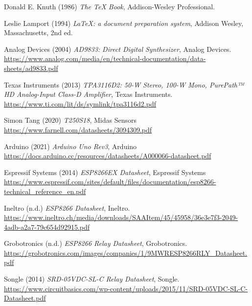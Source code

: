 \begin{thebibliography}{9}
Donald E. Knuth (1986) \emph{The \TeX{} Book}, Addison-Wesley Professional.

Leslie Lamport (1994) \emph{\LaTeX: a document preparation system}, Addison
Wesley, Massachusetts, 2nd ed.
    
Analog Devices (2004) \emph{AD9833: Direct Digital Synthesizer}, Analog Devices.
\url{https://www.analog.com/media/en/technical-documentation/data-sheets/ad9833.pdf}

Texas Instruments (2013) \emph{TPA3116D2: 50-W Stereo, 100-W Mono, PurePath™ HD Analog-Input Class-D Amplifier}, Texas Instruments.
\url{https://www.ti.com/lit/ds/symlink/tpa3116d2.pdf}

Simon Tang (2020) \emph{T250S18}, Midas Sensors
\url{https://www.farnell.com/datasheets/3094309.pdf}

Arduino (2021) \emph{Arduino Uno Rev3}, Arduino
\url{https://docs.arduino.cc/resources/datasheets/A000066-datasheet.pdf}

Espressif Systems (2014) \emph{ESP8266EX Datasheet}, Espressif Systems
\url{https://www.espressif.com/sites/default/files/documentation/esp8266-technical_reference_en.pdf}

Ineltro (n.d.) \emph{ESP8266 Datasheet}, Ineltro.
\url{https://www.ineltro.ch/media/downloads/SAAItem/45/45958/36e3e7f3-2049-4adb-a2a7-79c654d92915.pdf}

Grobotronics (n.d.) \emph{ESP8266 Relay Datasheet}, Grobotronics.
\url{https://grobotronics.com/images/companies/1/9MWRESP8266RLY_Datasheet.pdf}

Songle (2014) \emph{SRD-05VDC-SL-C Relay Datasheet}, Songle.
\url{https://www.circuitbasics.com/wp-content/uploads/2015/11/SRD-05VDC-SL-C-Datasheet.pdf}


\end{thebibliography}